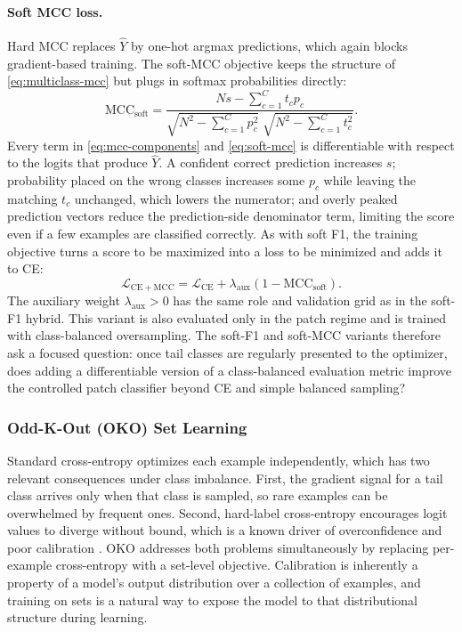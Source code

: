 \documentclass[11pt]{article}
\begin{document}
\paragraph{Soft MCC loss.}
Hard MCC replaces $\widehat{Y}$ by one-hot argmax predictions, which again blocks gradient-based training. The soft-MCC objective keeps the structure of \eqref{eq:multiclass-mcc} but plugs in softmax probabilities directly:
\begin{equation}
  \mathrm{MCC}_{\mathrm{soft}} =
  \frac{Ns - \sum_{c=1}^{C} t_c p_c}
       {\sqrt{N^2 - \sum_{c=1}^{C} p_c^2}\;
        \sqrt{N^2 - \sum_{c=1}^{C} t_c^2}}.
  \label{eq:soft-mcc}
\end{equation}
\noindent Every term in \eqref{eq:mcc-components} and \eqref{eq:soft-mcc} is differentiable with respect to the logits that produce $\widehat{Y}$. A confident correct prediction increases $s$; probability placed on the wrong classes increases some $p_c$ while leaving the matching $t_c$ unchanged, which lowers the numerator; and overly peaked prediction vectors reduce the prediction-side denominator term, limiting the score even if a few examples are classified correctly. As with soft F1, the training objective turns a score to be maximized into a loss to be minimized and adds it to CE:
\begin{equation}
  \mathcal{L}_{\mathrm{CE+MCC}} =
  \mathcal{L}_{\mathrm{CE}} + \lambda_{\mathrm{aux}}
  \left(1-\mathrm{MCC}_{\mathrm{soft}}\right).
  \label{eq:ce-soft-mcc}
\end{equation}
\noindent The auxiliary weight $\lambda_{\mathrm{aux}}>0$ has the same role and validation grid as in the soft-F1 hybrid. This variant is also evaluated only in the patch regime and is trained with class-balanced oversampling. The soft-F1 and soft-MCC variants therefore ask a focused question: once tail classes are regularly presented to the optimizer, does adding a differentiable version of a class-balanced evaluation metric improve the controlled patch classifier beyond CE and simple balanced sampling?

\subsubsection{Odd-K-Out (OKO) Set Learning}
Standard cross-entropy optimizes each example independently, which has two relevant consequences under class imbalance. First, the gradient signal for a tail class arrives only when that class is sampled, so rare examples can be overwhelmed by frequent ones. Second, hard-label cross-entropy encourages logit values to diverge without bound, which is a known driver of overconfidence and poor calibration \citep{guo2017calibration}. OKO \citep{muttenthaler2024setLearning} addresses both problems simultaneously by replacing per-example cross-entropy with a set-level objective. Calibration is inherently a property of a model's output distribution over a collection of examples, and training on sets is a natural way to expose the model to that distributional structure during learning.
\end{document}
